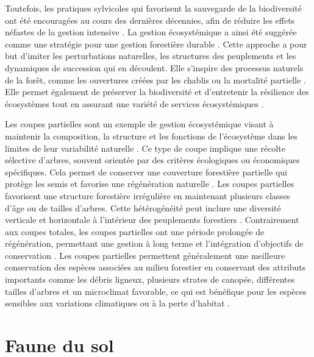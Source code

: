 Toutefois, les pratiques sylvicoles qui favorisent la sauvegarde de la biodiversité ont été encouragées au cours des dernières décennies, afin de réduire les effets néfastes de la gestion intensive \citep{Gustafsson2012Retentionforestry}. 
La gestion écosystémique a ainsi été suggérée comme une stratégie pour une gestion forestière durable \citep{Perry1998scientificbasis,Kuuluvainen2002Naturalvariabilitya}. 
Cette approche a pour but d'imiter les perturbations naturelles, les structures des peuplements et les dynamiques de succession qui en découlent. 
Elle s'inspire des processus naturels de la forêt, comme les ouvertures créées par les chablis ou la mortalité partielle \citep{Bergeron2007Usingknowledge}.
Elle permet également de préserver la biodiversité et d'entretenir la résilience des écosystèmes tout en assurant une variété de services écosystémiques \citep{Szaro1998emergenceecosystem,MacDicken2015Globalprogress}. 

Les coupes partielles sont un exemple de gestion écosystémique visant à maintenir la composition, 
la structure et les fonctions de l'écosystème dans les limites de leur variabilité naturelle \citep{Bergeron1999Forestmanagementa,Raymond2009irregularshelterwood}.
Ce type de coupe implique une récolte sélective d'arbres, souvent orientée par des critères écologiques ou économiques spécifiques. 
Cela permet de conserver une couverture forestière partielle qui protège les semis et favorise une régénération naturelle \citep{Raymond2009irregularshelterwood}.
Les coupes partielles favorisent une structure forestière irrégulière en maintenant plusieurs classes d'âge ou de tailles d'arbres. 
Cette hétérogénéité peut inclure une diversité verticale et horizontale à l'intérieur des peuplements forestiers \citep{Raymond2009irregularshelterwood}.
Contrairement aux coupes totales, les coupes partielles ont une période prolongée de régénération, 
permettant une gestion à long terme et l'intégration d'objectifs de conservation \citep{Raymond2009irregularshelterwood}.
Les coupes partielles permettent généralement une meilleure conservation des espèces associées au milieu forestier en conservant des attributs importants comme les débris ligneux, 
plusieurs strates de canopée, différentes tailles d'arbres et un microclimat favorable, 
ce qui est bénéfique pour les espèces sensibles aux variations climatiques ou à la perte d'habitat \citep{Hansen1991Conservingbiodiversity}. 


\section*{Faune du sol}
\label{sec:soilfauna}


